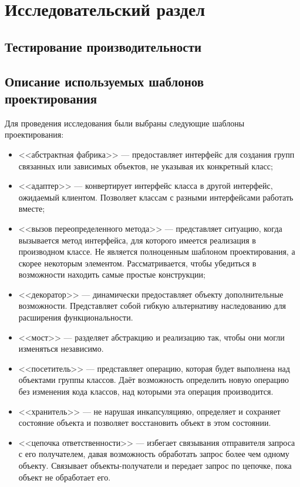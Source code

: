 \chapter{Исследовательский раздел}
\label{cha:research}

\section{Тестирование производительности}

\section{Описание используемых шаблонов проектирования}

Для проведения исследования были выбраны следующие шаблоны проектирования:
\begin{itemize}
\item <<абстрактная фабрика>> --- предоставляет интерфейс для создания групп
связанных или зависимых объектов, не указывая их конкретный класс;
\item <<адаптер>> --- конвертирует интерфейс класса в другой интерфейс,
ожидаемый клиентом. Позволяет классам с разными интерфейсами работать вместе;
\item <<вызов переопределенного метода>> --- представляет ситуацию,
когда вызывается метод интерфейса,
для которого имеется реализация в производном классе.
Не является полноценным шаблоном проектирования, а скорее некоторым элементом.
Рассматривается, чтобы убедиться в возможности находить самые простые конструкции;
\item <<декоратор>> --- динамически предоставляет объекту дополнительные
возможности.
Представляет собой гибкую альтернативу наследованию для расширения
функциональности.
\item <<мост>> --- разделяет абстракцию и реализацию так,
чтобы они могли изменяться независимо.
\item <<посетитель>> --- представляет операцию, которая будет выполнена над
объектами группы классов.
Даёт возможность определить новую операцию без изменения кода классов,
над которыми эта операция производится.
\item <<хранитель>> --- не нарушая инкапсуляцияю, определяет и сохраняет
состояние объекта и позволяет восстановить объект в этом состоянии.
\item <<цепочка ответственности>> --- избегает связывания отправителя запроса с
его получателем, давая возможность обработать запрос более чем одному объекту.
Связывает объекты-получатели и передает запрос по цепочке, пока объект не
обработает его.
\end{itemize}

